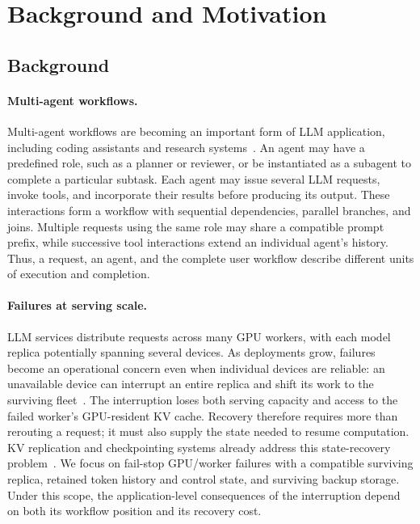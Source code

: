 \section{Background and Motivation}
\label{sec:background-motivation}

\subsection{Background}
\label{sec:motivation-background}

\paragraph{Multi-agent workflows.}
Multi-agent workflows are becoming an important form of LLM application,
including coding assistants and research systems~\cite{wu2023autogen,anthropic2025multiagent}.
An agent may have a predefined role, such as a planner or reviewer, or be
instantiated as a subagent to complete a particular subtask. Each agent
may issue several LLM requests, invoke tools, and incorporate their results
before producing its output. These interactions form a workflow with
sequential dependencies, parallel branches, and joins. Multiple requests
using the same role may share a compatible prompt prefix, while successive
tool interactions extend an individual agent's history. Thus, a request,
an agent, and the complete user workflow describe different units of
execution and completion.

\paragraph{Failures at serving scale.}
LLM services distribute requests across many GPU workers, with each model
replica potentially spanning several devices. As deployments grow,
failures become an operational concern even when individual devices are
reliable: an unavailable device can interrupt an entire replica and shift
its work to the surviving fleet~\cite{cao2026lumen}. The interruption loses
both serving capacity and access to the failed worker's GPU-resident KV
cache. Recovery therefore requires more than rerouting a request; it must
also supply the state needed to resume computation. KV replication and
checkpointing systems already address this state-recovery
problem~\cite{strati2024dejavu,jayakody2026ghostserve,cao2026lumen}.
We focus on fail-stop GPU/worker failures with a compatible surviving
replica, retained token history and control state, and surviving backup
storage. Under this scope, the application-level consequences of the
interruption depend on both its workflow position and its recovery cost.

